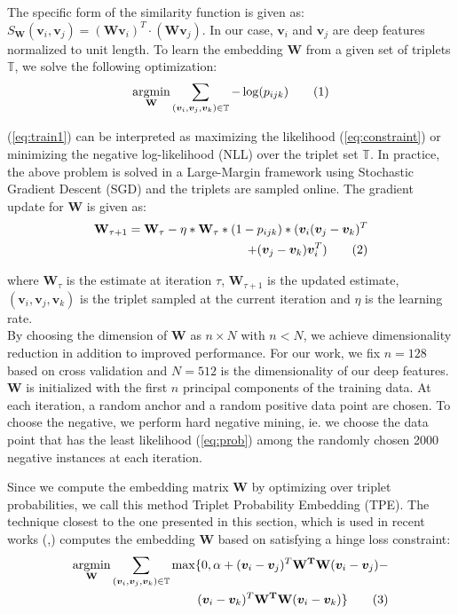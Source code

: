 \documentclass[10pt,twocolumn,letterpaper]{article}
\newcommand{\mbf}[1]{\ensuremath{\mathbf{#1}}}
\newcommand*\tageq{\refstepcounter{equation}\tag{\theequation}}
\begin{document}
The specific form of the similarity function is given as:
$S_\mbf{W}(\bm{v}_i,\bm{v}_j)= (\mbf{W}\bm{v}_i)^T \cdot (\mbf{W} \bm{v}_j)$. In our case, $\bm{v}_i$ and $\bm{v}_j$ are deep features normalized to unit length. To learn the embedding $\mbf{W}$ from a given set of triplets $\mathbb{T}$, we solve the following optimization:
\vspace{-2.5mm}
\begin{align*}
  \underset{\mbf{W}}{\text{argmin}} \sum_{ (\bm{v}_i,\bm{v}_j,\bm{v}_k) \in \mathbb{T}} - \log(p_{ijk}) 
\tageq \label{eq:train1}
\end{align*}

(\ref{eq:train1}) can be interpreted as maximizing the likelihood
(\ref{eq:constraint}) or minimizing the negative log-likelihood (NLL) over the
triplet set $\mathbb{T}$.  In practice, the above problem is solved in a
Large-Margin framework using Stochastic Gradient Descent (SGD) and the triplets
are sampled online. The gradient update for $\mbf{W}$ is given as:
\begin{align*}
  \mbf{W}_{\tau+1} = \mbf{W}_\tau - \eta * \mbf{W}_\tau *(1-p_{ijk})* (\bm{v}_i(\bm{v}_j-\bm{v}_k)^T \\
  + (\bm{v}_j-\bm{v}_k)\bm{v}_i^T)
\tageq \label{eq:update}
\end{align*}

where $\mbf{W}_\tau$ is the estimate at iteration $\tau$, $\mbf{W}_{\tau+1}$ is the
updated estimate, $(\bm{v}_i,\bm{v}_j,\bm{v}_k)$ is the triplet sampled at the current iteration and $\eta$ is the learning rate.\\ 

By choosing the dimension of $\mbf{W}$ as $n \times N$ with $n < N$, we achieve
dimensionality reduction in addition to improved performance. For our work, we fix
$n=128$ based on cross validation and $N=512$ is the dimensionality of our deep
features. $\mbf{W}$ is initialized with the first $n$ principal components of
the training data. At each iteration, a random anchor and a random positive data
point are chosen. To choose the negative, we perform hard negative mining, ie.
we choose the data point that has the least likelihood (\ref{eq:prob}) among the
randomly chosen 2000 negative instances at each iteration.





Since we compute the embedding matrix $\mbf{W}$ by optimizing over triplet
probabilities, we call this method Triplet Probability Embedding (TPE). The
technique closest to the one presented in this section, which is used in recent
works (\cite{facenet15},\cite{parkhi15}) computes the embedding \mbf{W} based on
satisfying a hinge loss constraint:
\begin{align*}
  \underset{\mbf{W}}{\text{argmin}} \sum_{ (\bm{v}_i,\bm{v}_j,\bm{v}_k) \in \mathbb{T}} \max\{0,\alpha + (\bm{v}_i-\bm{v}_j)^T\mbf{W^TW}(\bm{v}_i-\bm{v}_j)- \\
  (\bm{v}_i-\bm{v}_k)^T\mbf{W^TW}(\bm{v}_i-\bm{v}_k) \}
\tageq \label{eq:dist}
\end{align*}
\end{document}
